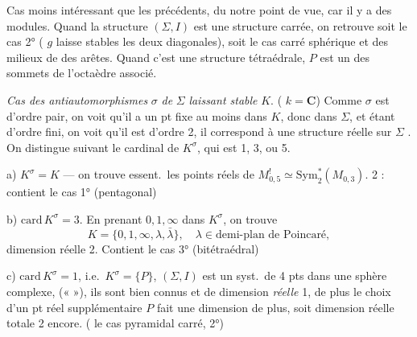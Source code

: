 \documentclass[11pt,a4paper]{article}
\begin{document}
Cas moins intéressant que les précédents, du notre point de vue, car il
y a des modules. Quand la structure $(\Sigma, I)$ est une structure
carrée, on retrouve soit le cas 2° ( $g$ laisse stables
les deux diagonales), soit le cas    carré sphérique
 et des milieux de  des arêtes.
 Quand
c'est une structure tétraédrale, $P$ est un des  sommets de
l'octaèdre associé.

\emph{Cas des antiautomorphismes} $\sigma$ \emph{de} $\Sigma$
\emph{laissant stable} $K$. ( $k =
\mathbf{C}$) Comme $\sigma$ est d'ordre pair, on voit
qu'il \struck{\ill{}} a un pt fixe au moins dans $K$, donc dans $\Sigma$,
et étant d'ordre fini, on voit qu'il est d'ordre 2, il correspond à une
structure réelle sur $\Sigma$ \struck{\ill{}}. On distingue suivant le
cardinal de $K^{\sigma}$, qui est 1, 3, ou 5.


a) $K^{\sigma} = K$ --- on trouve essent.\ les points réels de
$M^{!}_{0,5} \simeq \mathrm{Sym}^{*}_{2}(M_{0,3})$.  
 2 : contient le cas 1° (pentagonal)

b) $\mathrm{card}\, K^{\sigma} = 3$. \struck{\ill{}} En prenant
\struck{\ill{}}  $0, 1, \infty$ dans $K^{\sigma}$, on
trouve
\[
K = \lbrace 0, 1, \infty, \lambda, \bar{\lambda} \rbrace , \quad
\lambda \in \text{demi-plan de Poincaré},
\]
dimension réelle 2. Contient le cas 3° (bitétraédral)

c) $\mathrm{card}\, K^{\sigma} = 1$, i.e.\ $K^{\sigma} = \lbrace P
\rbrace$,  $(\Sigma, I)$ est un syst.\ de 4 pts dans une sphère
complexe, \struck{\ill{}}  
\ill{} \ill{} («  »), ils sont bien connus et de
dimension  \emph{réelle} 1, de plus le choix d'un pt
réel supplémentaire $P$ fait une dimension de plus, soit dimension réelle
totale 2 encore. ( le cas pyramidal carré,
2°)
\end{document}
